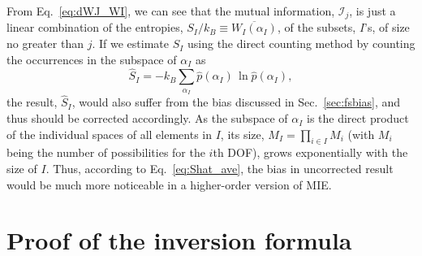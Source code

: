 \documentclass[reprint, superscriptaddress]{revtex4-1}
\newcommand{\note}[1]{{\color{DarkGreen}\footnotesize \textsc{Note.} #1}}
\newcommand{\MI}{\mathcal I} %
\begin{document}
%


From Eq.~\eqref{eq:dWJ_WI},
we can see that the mutual information, $\MI_j$, is just a linear combination
of the entropies,
$S_I / k_B \equiv \overline{ W_I(\alpha_I) }$,
of the subsets, $I$'s, of size no greater than $j$.
%
If we estimate $S_I$ using the direct counting method
by counting the occurrences in the subspace of $\alpha_I$ as
$$
\hat S_I = - k_B \sum_{\alpha_I} \hat p(\alpha_I) \, \ln \hat p(\alpha_I),
$$
the result, $\hat S_I$, would also suffer from the bias discussed
in Sec.~\ref{sec:fsbias}, and thus should be corrected accordingly.
%
As the subspace of $\alpha_I$ is the direct product of
the individual spaces of all elements in $I$,
its size, $M_I = \prod_{i \in I} M_i$
(with $M_i$ being the number of possibilities for the $i$th DOF),
grows exponentially with the size of $I$.
%
Thus, according to Eq.~\eqref{eq:Shat_ave},
the bias in uncorrected result would be much more noticeable
in a higher-order version of MIE.



\section{\label{sec:inclexcl}
Proof of the inversion formula }
\end{document}
